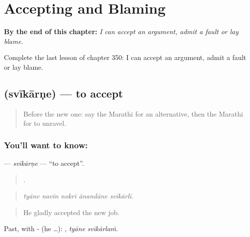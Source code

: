 
\chapter{Accepting and Blaming}
\label{ch:mr-accepting-and-blaming}

\begin{chapteropening}
\textbf{By the end of this chapter:} \emph{I can accept an argument, admit a fault or lay blame.}

Complete the last lesson of chapter 350: I can accept an argument, admit a fault or lay blame.
\end{chapteropening}

\section[\texorpdfstring{\mr{स्वीकारणे} (svīkārṇe)}{स्वीकारणे (svīkārṇe)}]{ (svīkārṇe) — to accept}

\label{lesson:MR-C350-svikarne}



\begin{quote}
Before the new one: say the Marathi for an alternative, then the Marathi for to unravel.
\end{quote}

\subsection*{You'll want to know: }
\textbf{} — \emph{svīkārṇe} — \textquotedblleft{}to accept\textquotedblright{}.

\begin{quote}
    .
\end{quote}

\begin{quote}
\emph{tyāne navīn nokrī ānandāne svīkārlī.}
\end{quote}

\begin{quote}
He gladly accepted the new job.
\end{quote}

Past, with - (he …):  , \emph{tyāne svīkārlaṁ}.

